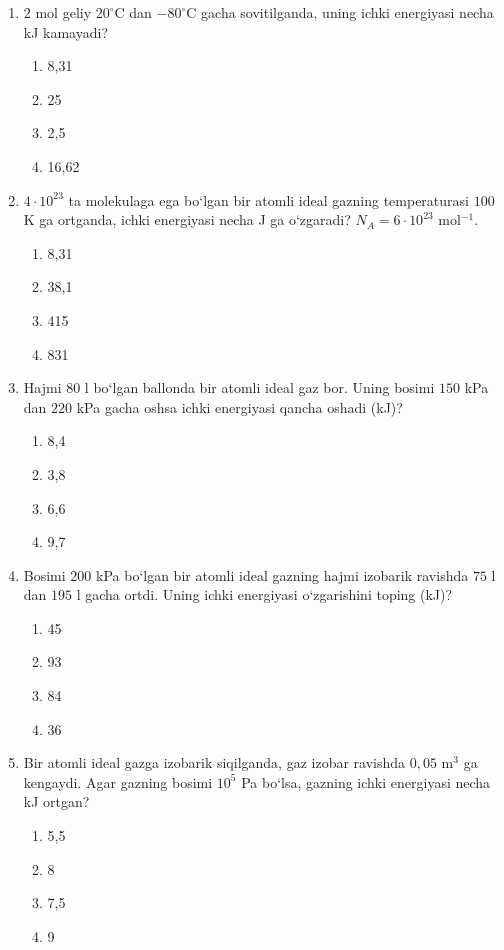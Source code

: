 \begin{enumerate}
\item $2$ mol geliy $20^\circ$C dan $-80^\circ$C gacha sovitilganda, uning ichki energiyasi necha kJ kamayadi?
\begin{enumerate}[label=\Alph*)]
\item 8,31
\item 25
\item 2,5
\item 16,62

\end{enumerate}

\item $4\cdot10^{23}$ ta molekulaga ega bo‘lgan bir atomli ideal gazning temperaturasi $100$ K ga ortganda, ichki energiyasi necha J ga o‘zgaradi? $N_A=6\cdot10^{23}$ mol$^{-1}$.
\begin{enumerate}[label=\Alph*)]
\item 8,31
\item 38,1
\item 415
\item 831

\end{enumerate}

\item Hajmi $80$ l bo‘lgan ballonda bir atomli ideal gaz bor. Uning bosimi $150$ kPa dan $220$ kPa gacha oshsa ichki energiyasi qancha oshadi (kJ)?
\begin{enumerate}[label=\Alph*)]
\item 8,4
\item 3,8
\item 6,6
\item 9,7

\end{enumerate}

\item Bosimi $200$ kPa bo‘lgan bir atomli ideal gazning hajmi izobarik ravishda $75$ l dan $195$ l gacha ortdi. Uning ichki energiyasi o‘zgarishini toping (kJ)?
\begin{enumerate}[label=\Alph*)]
\item 45
\item 93
\item 84
\item 36

\end{enumerate}

\item Bir atomli ideal gazga izobarik siqilganda, gaz izobar ravishda $0,05$ m$^3$ ga kengaydi. Agar gazning bosimi $10^5$ Pa bo‘lsa, gazning ichki energiyasi necha kJ ortgan?
\begin{enumerate}[label=\Alph*)]
\item 5,5
\item 8
\item 7,5
\item 9
\end{enumerate}


\end{enumerate}
